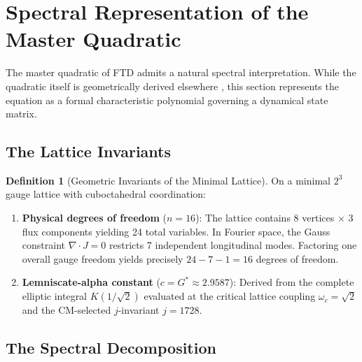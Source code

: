 \documentclass[12pt]{article}
\theoremstyle{definition}
\newtheorem{definition}{Definition}[section]
\theoremstyle{remark}
\begin{document}
\section{Spectral Representation of the Master Quadratic}
\label{sec:spectral}

The master quadratic of FTD admits a natural spectral interpretation. While the quadratic itself is geometrically derived elsewhere \cite{Anon2026_Zenodo}, this section represents the equation as a formal characteristic polynomial governing a dynamical state matrix.

\subsection{The Lattice Invariants}

\begin{definition}[Geometric Invariants of the Minimal Lattice]
\label{def:invariants}
On a minimal $2^3$ gauge lattice with cuboctahedral coordination:
\begin{enumerate}[noitemsep]
    \item \textbf{Physical degrees of freedom} ($n = 16$): The lattice contains 8 vertices $\times$ 3 flux components yielding 24 total variables. In Fourier space, the Gauss constraint $\nabla \cdot J = 0$ restricts 7 independent longitudinal modes. Factoring one overall gauge freedom yields precisely $24 - 7 - 1 = 16$ degrees of freedom.
    \item \textbf{Lemniscate-alpha constant} ($c = G^{*} \approx 2.9587$): Derived from the complete elliptic integral $K(1/\sqrt{2})$ evaluated at the critical lattice coupling $\omega_c = \sqrt{2}$ and the CM-selected $j$-invariant $j = 1728$.
\end{enumerate}
\end{definition}

\subsection{The Spectral Decomposition}
\end{document}
